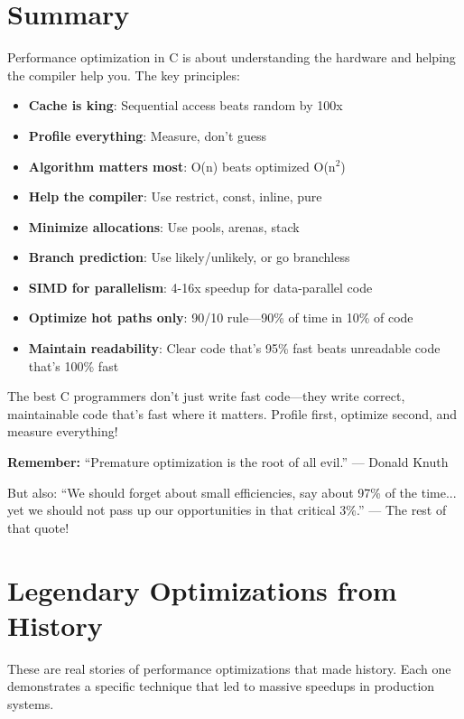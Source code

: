\section{Summary}

Performance optimization in C is about understanding the hardware and helping the compiler help you. The key principles:

\begin{itemize}
    \item \textbf{Cache is king}: Sequential access beats random by 100x
    \item \textbf{Profile everything}: Measure, don't guess
    \item \textbf{Algorithm matters most}: O(n) beats optimized O(n$^2$)
    \item \textbf{Help the compiler}: Use restrict, const, inline, pure
    \item \textbf{Minimize allocations}: Use pools, arenas, stack
    \item \textbf{Branch prediction}: Use likely/unlikely, or go branchless
    \item \textbf{SIMD for parallelism}: 4-16x speedup for data-parallel code
    \item \textbf{Optimize hot paths only}: 90/10 rule---90\% of time in 10\% of code
    \item \textbf{Maintain readability}: Clear code that's 95\% fast beats unreadable code that's 100\% fast
\end{itemize}

The best C programmers don't just write fast code---they write correct, maintainable code that's fast where it matters. Profile first, optimize second, and measure everything!

\begin{tipbox}
\textbf{Remember:} ``Premature optimization is the root of all evil.'' --- Donald Knuth

But also: ``We should forget about small efficiencies, say about 97\% of the time... yet we should not pass up our opportunities in that critical 3\%.'' --- The rest of that quote!
\end{tipbox}

\section{Legendary Optimizations from History}

These are real stories of performance optimizations that made history. Each one demonstrates a specific technique that led to massive speedups in production systems.

